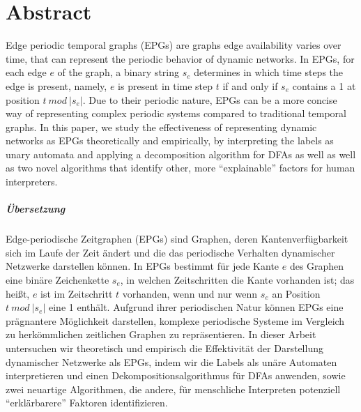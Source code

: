 \chapter*{Abstract}
Edge periodic temporal graphs (EPGs) are graphs edge availability varies over time, that can represent the periodic behavior of dynamic networks. In EPGs, for each edge $e$ of the graph, a binary string $s_e$ determines in which time steps the edge is present, namely, $e$ is present in time step $t$ if and only if $s_e$ contains a 1 at position $t~ mod~ |s_e|$. Due to their periodic nature, EPGs can be a more concise way of representing complex periodic systems compared to traditional temporal graphs. In this paper, we study the effectiveness of representing dynamic networks as EPGs theoretically and empirically, by interpreting the labels as unary automata and applying a decomposition algorithm for DFAs as well as well as two novel algorithms that identify other, more \enquote{explainable} factors for human interpreters.

\paragraph{Übersetzung}
Edge-periodische Zeitgraphen (EPGs)  sind Graphen, deren Kantenverfügbarkeit sich im Laufe der Zeit ändert und die das periodische Verhalten dynamischer Netzwerke darstellen können. In EPGs bestimmt für jede Kante $e$ des Graphen eine binäre Zeichenkette $s_e$, in welchen Zeitschritten die Kante vorhanden ist; das heißt, $e$ ist im Zeitschritt $t$ vorhanden, wenn und nur wenn $s_e$ an Position $t~ mod~ |s_e|$ eine 1 enthält. Aufgrund ihrer periodischen Natur können EPGs eine prägnantere Möglichkeit darstellen, komplexe periodische Systeme im Vergleich zu herkömmlichen zeitlichen Graphen zu repräsentieren. In dieser Arbeit untersuchen wir theoretisch und empirisch die Effektivität der Darstellung dynamischer Netzwerke als EPGs, indem wir die Labels als unäre Automaten interpretieren und einen Dekompositionsalgorithmus für DFAs anwenden, sowie zwei neuartige Algorithmen, die andere, für menschliche Interpreten potenziell \enquote{erklärbarere} Faktoren identifizieren.